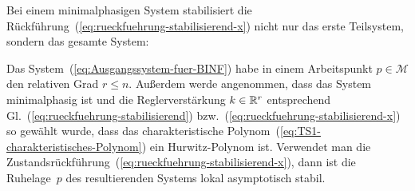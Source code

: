 Bei einem minimalphasigen System stabilisiert die Rückführung~(\ref{eq:rueckfuehrung-stabilisierend-x})
nicht nur das erste Teilsystem, sondern das gesamte System:
\begin{theorem}
\label{thm:Stabilisierung-EA-lokal}Das System~(\ref{eq:Ausgangssystem-fuer-BINF})
habe in einem Arbeitspunkt $p\in\mathcal{M}$ den relativen Grad $r\leq n$.
Außerdem werde angenommen, dass das System minimalphasig ist und die
Reglerverstärkung $k\in{\mathbb{R}}^{r}$ entsprechend Gl.~(\ref{eq:rueckfuehrung-stabilisierend})
bzw.~(\ref{eq:rueckfuehrung-stabilisierend-x}) so gewählt wurde,
dass das charakteristische Polynom~(\ref{eq:TS1-charakteristisches-Polynom})
ein Hurwitz-Polynom ist. Verwendet man die Zustandsrückführung~(\ref{eq:rueckfuehrung-stabilisierend-x}),
dann ist die Ruhelage~$p$ des resultierenden Systems lokal asymptotisch
stabil.
\end{theorem}
